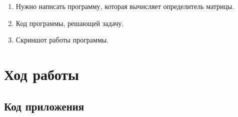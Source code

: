 \documentclass[12pt,a4paper]{scrartcl}
\begin{document}
\begin{enumerate}
 \item Нужно написать программу, которая вычисляет определитель матрицы.
 \item Код программы, решающей задачу.
 \item Скриншот работы программы.
\end{enumerate}

\section{Ход работы}
\label{sec:exp}

\subsection{Код приложения}
\label{sec:exp:code}
\end{document}
